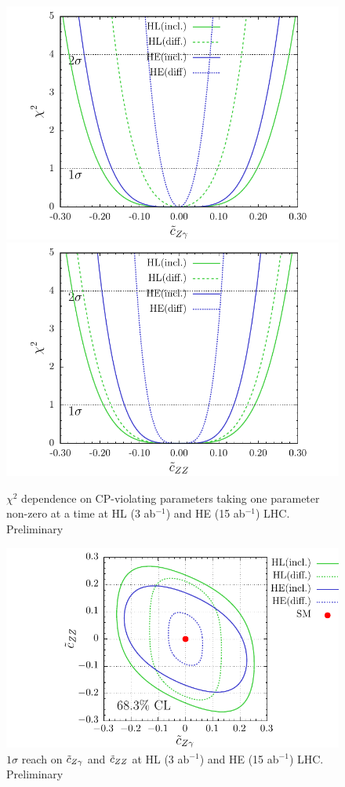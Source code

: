 \begin{figure}[h!]
\centering
 \includegraphics[scale=0.6]{tCza-Chisq-HL3ab-HE15ab}
\includegraphics[scale=0.6]{tCzz-Chisq-HL3ab-HE15ab}
\caption{$\chi^2$ dependence on CP-violating parameters taking one parameter non-zero at a time 
at HL (3 ab$^{-1}$) and HE (15 ab$^{-1}$) LHC. {\cred Preliminary} }\label{fig:fit1p}
\end{figure}

\begin{figure}
\centering
 \includegraphics[scale=1.2]{tCza-tCzz-HL3ab-HE15ab}
\caption{$1\sigma$  reach on $\tilde c_{Z\gamma}$ and 
$\tilde c_{ZZ}$ at HL (3 ab$^{-1}$) and HE (15 ab$^{-1}$) LHC. {\cred Preliminary} }\label{fig:fit2p}
\end{figure}




